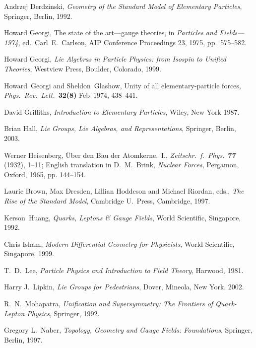 \documentclass[12pt]{article}
\begin{document}
\begin{thebibliography}{99}
Andrzej Derdzinski, {\em {Geometry of the Standard Model of Elementary
Particles}}, Springer, Berlin, 1992.

Howard Georgi, The state of the art---gauge theories, in {\em Particles and
Fields---1974}, ed.\ Carl\ E.\ Carlson, AIP Conference Proceedings 23, 1975,
pp.\  575--582.

Howard Georgi, {\em {Lie Algebras in Particle Physics: from 
Isospin to Unified Theories}}, Westview Press, Boulder, Colorado, 1999. 

Howard\ Georgi and Sheldon\ Glashow, Unity of all elementary-particle forces,
{\em Phys.\ Rev.\ Lett.\ }{\bf 32(8)} {Feb\ 1974}, 438--441. 

David Griffiths, {\em {Introduction to Elementary Particles}}, Wiley, New
York 1987.

Brian Hall, {\em {Lie Groups, Lie Algebras, and Representations}}, 
Springer, Berlin, 2003. 

 Werner Heisenberg, \"Uber den Bau der Atomkerne.\ I., {\em {Zeitschr.\ f.\ Phys.\
}}{\bf 77} (1932), 1--11; English translation in D.\ M.\ Brink, {\em {Nuclear
Forces}}, Pergamon, Oxford, 1965, pp. 144--154.

 Laurie Brown, Max Dresden, Lillian Hoddeson and 
Michael Riordan, eds., {\em {The Rise of the Standard Model}}, 
Cambridge U.\ Press, Cambridge, 1997.
 
Kerson\ Huang, {\em {Quarks, Leptons \& Gauge Fields}}, World Scientific,
Singapore, 1992.

Chris Isham, {\em {Modern Differential Geometry for Physicists}}, 
World Scientific, Singapore, 1999.

T.\ D.\ Lee, {\em {Particle Physics and Introduction to Field Theory}}, 
Harwood, 1981.

Harry J.\ Lipkin, {\em {Lie Groups for Pedestrians}}, Dover, Mineola,
New York, 2002.

R.\ N.\ Mohapatra, {\em {Unification and Supersymmetry: The Frontiers of
Quark-Lepton Physics}}, Springer, 1992.

Gregory L.\ Naber, {\em{Topology, Geometry and Gauge Fields: Foundations}}, 
Springer, Berlin, 1997. 


\end{thebibliography}
\end{document}
